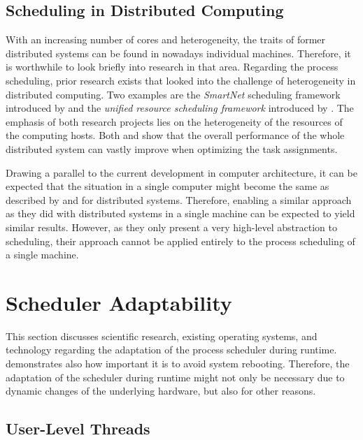 \subsection{Scheduling in Distributed Computing}

With an increasing number of cores and heterogeneity, the traits of former distributed systems can be found in nowadays individual machines. Therefore, it is worthwhile to look briefly into research in that area. Regarding the process scheduling, prior research exists that looked into the challenge of heterogeneity in distributed computing. Two examples are the \emph{SmartNet} scheduling framework introduced by \textcite{Freund-1996-SmartNet} and the \emph{unified resource scheduling framework} introduced by \textcite{Alhusaini-1999-URSFramework}. The emphasis of both research projects lies on the heterogeneity of the resources of the computing hosts. Both \citeauthor{Freund-1996-SmartNet} and \citeauthor{Alhusaini-1999-URSFramework} show that the overall performance of the whole distributed system can vastly improve when optimizing the task assignments.

Drawing a parallel to the current development in computer architecture, it can be expected that the situation in a single computer might become the same as described by \citeauthor{Freund-1996-SmartNet} and \citeauthor{Alhusaini-1999-URSFramework} for distributed systems. Therefore, enabling a similar approach as they did with distributed systems in a single machine can be expected to yield similar results. However, as they only present a very high-level abstraction to scheduling, their approach cannot be applied entirely to the process scheduling of a single machine.

\section{Scheduler Adaptability}%
\label{sec:rw:adaptability}

This section discusses scientific research, existing operating systems, and technology regarding the adaptation of the process scheduler during runtime.  demonstrates also how important it is to avoid system rebooting. Therefore, the adaptation of the scheduler during runtime might not only be necessary due to dynamic changes of the underlying hardware, but also for other reasons.

\subsection{User-Level Threads}

